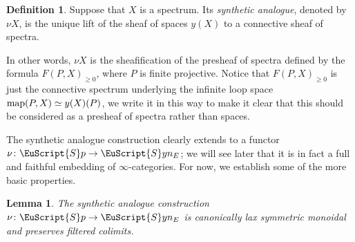 \documentclass[oneside,a4paper]{amsart}
\newcommand{\euscr}[1]{\EuScript{#1}} %
\newcommand{\map}{\textnormal{map}} %
\newcommand{\spectra}{\euscr{S}p} %
\newcommand{\synspectra}{\euscr{S}yn} %
\theoremstyle{plain}
\newtheorem{lemma}[thm]{Lemma}
\theoremstyle{definition}
\newtheorem{defin}[thm]{Definition}
\theoremstyle{remark}
\begin{document}
\begin{defin}
Suppose that $X$ is a spectrum. Its \emph{synthetic analogue}, denoted by $\nu X$, is the unique lift of the sheaf of spaces $y(X)$ to a connective sheaf of spectra. 
\end{defin}
In other words, $\nu X$ is the sheafification of the presheaf of spectra defined by the formula $F(P, X)_{\geq 0}$, where $P$ is finite projective. Notice that $F(P, X)_{\geq 0}$ is just the connective spectrum underlying the infinite loop space $\map(P, X) \simeq y(X)(P)$, we write it in this way to make it clear that this should be considered as a presheaf of spectra rather than spaces.

The synthetic analogue construction clearly extends to a functor $\nu \colon \spectra \rightarrow \synspectra_{E}$; we will see later that it is in fact a full and faithful embedding of $\infty$-categories. For now, we establish some of the more basic properties. 

\begin{lemma}
\label{lemma:synthetic_analogue_construction_preserves_filtered_colimits_and_is_lax_symmetric_monoidal}
The synthetic analogue construction $\nu \colon \spectra \rightarrow \synspectra_{E}$ is canonically lax symmetric monoidal and preserves filtered colimits. 
\end{lemma}
\end{document}
